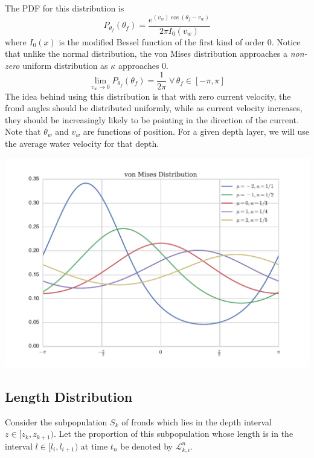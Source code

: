 \documentclass[10pt]{article}
\newenvironment{mcfig}
	{\par\medskip\noindent\minipage{\linewidth}}
	{\endminipage\par\medskip}
\newcommand\LL{\mathcal{L}}
\begin{document}
\begin{multicols}{2}
The PDF for this distribution is
\begin{equation}
	P_{\theta_f}(\theta_f) = \frac{e^{(v_w)\cos(\theta_f-v_w)}}{2\pi I_0(v_w)}
\end{equation}
where $I_0(x)$ is the modified Bessel function of the first kind of order 0.
Notice that unlike the normal distribution, the von Mises distribution approaches a \textit{non-zero} uniform distribution as $\kappa$ approaches 0.
\begin{equation}
	\displaystyle \lim_{v_w \to 0}P_{\theta_f}(\theta_f) = \frac{1}{2\pi} \;\forall\, \theta_f \in [-\pi,\pi]
\end{equation}
The idea behind using this distribution is that with zero current velocity, the frond angles should be distributed uniformly, while as current velocity increases, they should be increasingly likely to be pointing in the direction of the current.
Note that $\theta_w$ and $v_w$ are functions of position.
For a given depth layer, we will use the average water velocity for that depth.

\begin{mcfig}
	\centering
	\includegraphics[width=\linewidth]{vonmises_2}
	\label{fig:vonmises}
\end{mcfig}

\subsection{Length Distribution}
Consider the subpopulation $S_k$ of fronds which lies in the depth interval $z \in [z_k,z_{k+1})$.
Let the proportion of this subpopulation whose length is in the interval $l \in [l_i,l_{i+1})$ at time $t_n$ be denoted by $\LL_{k,i}^n$.


\end{multicols}
\end{document}
